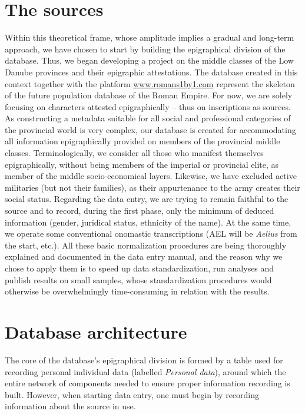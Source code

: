 \documentclass[amsthm,ebook]{saparticle}
\begin{document}
\section{The sources}

\noindent Within this theoretical frame, whose amplitude implies a gradual and long-term approach, we have chosen to start by
building the epigraphical division of the database. Thus, we began developing a project on the middle classes of the
Low Danube provinces and their epigraphic attestations. The database created in this context together with the platform
\url{www.romans1by1.com} represent the skeleton of the future population database of the Roman Empire.
For now, we are solely focusing on characters attested epigraphically – thus on inscriptions as sources. As constructing
a metadata suitable for all social and professional categories of the provincial world is very complex, our database is
created for accommodating all information epigraphically provided on members of the provincial middle classes.
Terminologically, we consider all those who manifest themselves epigraphically, without being members of the imperial
or provincial elite, as member of the middle socio-economical layers. Likewise, we have excluded active militaries (but
not their families), as their appurtenance to the army creates their social status.
Regarding the data entry, we are trying to remain faithful to the source and to record, during the first phase, only the
minimum of deduced information (gender, juridical status, ethnicity of the name). At the same time, we operate some
conventional onomastic transcriptions (AEL will be \emph{Aelius} from the start, etc.). All these basic normalization
procedures are being thoroughly explained and documented in the data entry manual, and the reason why we chose to apply
them is to speed up data standardization, run analyses and publish results on small samples, whose standardization
procedures would otherwise be overwhelmingly time-consuming in relation with the results.

\section{Database architecture}

\noindent The core of the database’s epigraphical division is formed by a table used for recording personal
individual data (labelled \emph{Personal data}), around which the entire network of components needed to ensure proper
information recording is built. However, when starting data entry, one must begin by recording information about the
source in use.
\end{document}
